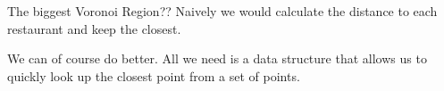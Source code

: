 \documentclass{writeup}
\begin{document}
\begin{solutions}
  \begin{solution}{The biggest Voronoi Region}{?}{?}
    Naively we would calculate the distance to each restaurant and keep the closest.
    
    We can of course do better. All we need is a data structure that allows us to quickly look up the closest point from a set of points.
    
  \end{solution}
\end{solutions}
\end{document}
